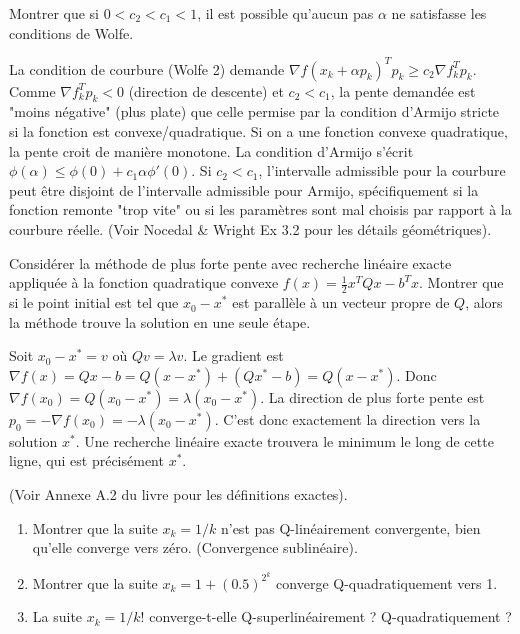 \bigskip
\begin{exercice}
Montrer que si $0 < c_2 < c_1 < 1$, il est possible qu'aucun pas $\alpha$ ne satisfasse les conditions de Wolfe.
\end{exercice}

\begin{correction}
La condition de courbure (Wolfe 2) demande $\nabla f(x_k + \alpha p_k)^T p_k \ge c_2 \nabla f_k^T p_k$.
Comme $\nabla f_k^T p_k < 0$ (direction de descente) et $c_2 < c_1$, la pente demandée est "moins négative" (plus plate) que celle permise par la condition d'Armijo stricte si la fonction est convexe/quadratique.
Si on a une fonction convexe quadratique, la pente croit de manière monotone.
La condition d'Armijo s'écrit $\phi(\alpha) \le \phi(0) + c_1 \alpha \phi'(0)$.
Si $c_2 < c_1$, l'intervalle admissible pour la courbure peut être disjoint de l'intervalle admissible pour Armijo, spécifiquement si la fonction remonte "trop vite" ou si les paramètres sont mal choisis par rapport à la courbure réelle.
(Voir Nocedal \& Wright Ex 3.2 pour les détails géométriques).
\end{correction}
\bigskip

\bigskip
\begin{exercice}
Considérer la méthode de plus forte pente avec recherche linéaire exacte appliquée à la fonction quadratique convexe $f(x) = \frac{1}{2}x^T Q x - b^T x$. 
Montrer que si le point initial est tel que $x_0 - x^*$ est parallèle à un vecteur propre de $Q$, alors la méthode trouve la solution en une seule étape.
\end{exercice}

\begin{correction}
Soit $x_0 - x^* = v$ où $Qv = \lambda v$.
Le gradient est $\nabla f(x) = Qx - b = Q(x - x^*) + (Qx^* - b) = Q(x-x^*)$.
Donc $\nabla f(x_0) = Q(x_0 - x^*) = \lambda (x_0 - x^*)$.
La direction de plus forte pente est $p_0 = -\nabla f(x_0) = -\lambda (x_0 - x^*)$.
C'est donc exactement la direction vers la solution $x^*$.
Une recherche linéaire exacte trouvera le minimum le long de cette ligne, qui est précisément $x^*$.
\end{correction}
\bigskip

\bigskip
\begin{exercice}
(Voir Annexe A.2 du livre pour les définitions exactes). 
\begin{enumerate}
    \item Montrer que la suite $x_k = 1/k$ n'est pas Q-linéairement convergente, bien qu'elle converge vers zéro. (Convergence sublinéaire).
    \item Montrer que la suite $x_k = 1 + (0.5)^{2^k}$ converge Q-quadratiquement vers 1.
    \item La suite $x_k = 1/k!$ converge-t-elle Q-superlinéairement ? Q-quadratiquement ?
\end{enumerate}
\end{exercice}

